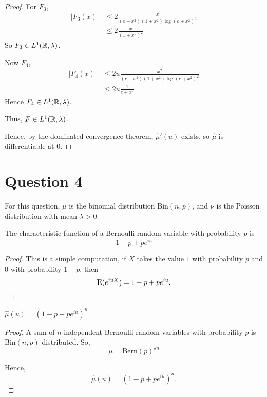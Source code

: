 \documentclass{unswmaths}
\begin{document}
\begin{proof}
    For $F_3$,
    \begin{align*}
        |F_3(x)| &\leq 2\frac{x}{(e+x^2)(1+x^2)\log(e+x^2)^2}\\
        &\leq 2\frac{x}{(1+x^2)^2}
    \end{align*}
    So $F_3 \in L^1(\mathbb{R},\lambda)$.
    
    Now $F_4$,
    \begin{align*}
        |F_4(x)| &\leq 2u\frac{x^2}{(e+x^2)(1+x^2)\log(e+x^2)^2}\\
        &\leq 2u\frac{1}{e+x^2}        
    \end{align*}
    Hence $F_4 \in L^1(\mathbb{R},\lambda)$.
    
    Thus, $F \in L^1(\mathbb{R},\lambda)$.
    
    Hence, by the dominated convergence theorem, $\hat{\mu}'(u)$
    exists, so $\hat{\mu}$ is differentiable at $0$.
\end{proof}

\section*{Question 4}
For this question, $\mu$ is the binomial distribution $\mathrm{Bin}(n,p)$,
and $\nu$ is the Poisson distribution with mean $\lambda > 0$.

\begin{lemma}
    The characteristic function of a Bernoulli random variable
    with probability $p$ is
    \begin{equation*}
        1-p+pe^{iu}
    \end{equation*}
\end{lemma}
\begin{proof}
    This is a simple computation, if $X$ takes the value $1$ with probability
    $p$ and $0$ with probability $1-p$, then
    \begin{equation*}
        {\rm I\kern-.3em E}(e^{iuX}) = 1-p+pe^{iu}.
    \end{equation*}
\end{proof}
\begin{lemma}
    $\hat{\mu}(u) = (1-p+pe^{iu})^n$.
\end{lemma}
\begin{proof}
    A sum of $n$ independent Bernoulli random variables with
    probability $p$ is $\mathrm{Bin}(n,p)$ distributed. So,
    \begin{equation*}
        {\mu} = {\mathrm{Bern}(p)}^{\star n}
    \end{equation*}
    
    Hence,
    \begin{equation*}
        \hat{\mu}(u) = (1-p+pe^{iu})^n.
    \end{equation*}
\end{proof}
\end{document}
